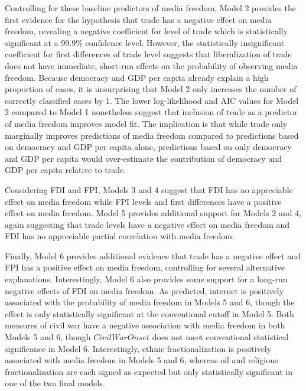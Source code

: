 \documentclass[12pt,a4paper]{article}
\begin{document}
Controlling for these baseline predictors of media freedom, Model 2 provides the first evidence for the hypothesis that trade has a negative effect on media freedom, revealing a negative coefficient for level of trade which is statistically significant at a 99.9\% confidence level. However, the statistically insignificant coefficient for first differences of trade level suggests that liberalization of trade does not have immediate, short-run effects on the probability of observing media freedom. Because democracy and GDP per capita already explain a high proportion of cases, it is unsurprising that Model 2 only increases the number of correctly classified cases by 1. The lower log-likelihood and AIC values for Model 2 compared to Model 1 nonetheless suggest that inclusion of trade as a predictor of media freedom improves model fit. The implication is that while trade only marginally improves predictions of media freedom compared to predictions based on democracy and GDP per capita alone, predictions based on only democracy and GDP per capita would over-estimate the contribution of democracy and GDP per capita relative to trade.

Considering FDI and FPI, Models 3 and 4 suggest that FDI has no appreciable effect on media freedom while FPI levels and first differences have a positive effect on media freedom. Model 5 provides additional support for Models 2 and 4, again suggesting that trade levels have a negative effect on media freedom and FDI has no appreciable partial correlation with media freedom.

Finally, Model 6 provides additional evidence that trade has a negative effect and FPI has a positive effect on media freedom, controlling for several alternative explanations. Interestingly, Model 6 also provides some support for a long-run negative effects of FDI on media freedom. As predicted, internet is positively associated with the probability of media freedom in Models 5 and 6, though the effect is only statistically significant at the conventional cutoff in Model 5. Both measures of civil war have a negative association with media freedom in both Models 5 and 6, though $Civil War Onset$ does not meet conventional statistical significance in Model 6. Interestingly, ethnic fractionalization is positively associated with media freedom in Models 5 and 6, whereas oil and religious fractionalization are each signed as expected but only statistically significant in one of the two final models.
\end{document}
